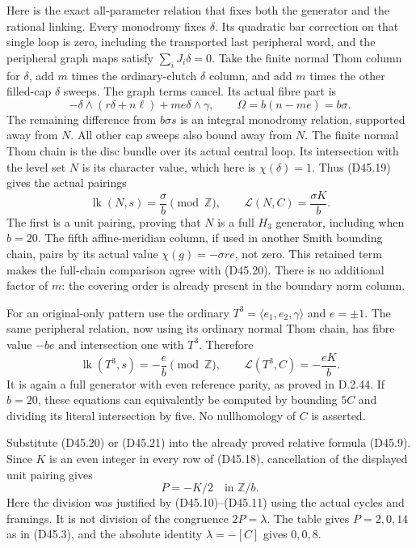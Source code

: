 Here is the exact all-parameter relation that fixes
both the generator and the rational linking.
Every monodromy fixes $\delta$. Its quadratic bar
correction on that single loop is zero, including
the transported last peripheral word, and the
peripheral graph maps satisfy $\sum_iJ_i\delta=0$.
Take the finite normal Thom column for $\delta$,
add $m$ times the ordinary-clutch $\delta$ column,
and add $m$ times the other filled-cap $\delta$ sweeps.
The graph terms cancel. Its actual fibre part is
\[
 -\delta\wedge(r\delta+n\ell)+me\delta\wedge\gamma,
 \qquad \Omega=b(n-me)=b\sigma.                            \tag{D45.19}
\]
The remaining difference from $b\sigma s$ is an
integral monodromy relation, supported away from $N$.
All other cap sweeps also bound away from $N$.
The finite normal Thom chain is the disc bundle
over its actual central loop. Its intersection
with the level set $N$ is its character value,
which here is $\chi(\delta)=1$.
Thus (D45.19) gives the actual pairings
\[
 \operatorname{lk}(N,s)=\frac{\sigma}{b}\pmod{\mathbb Z},
 \qquad \mathcal L(N,C)=\frac{\sigma K}{b}.                 \tag{D45.20}
\]
The first is a unit pairing, proving that $N$ is a
full $H_3$ generator, including when $b=20$.
The fifth affine-meridian column, if used in another
Smith bounding chain, pairs by its actual value
$\chi(g)=-\sigma re$, not zero. This retained term
makes the full-chain comparison agree with (D45.20).
There is no additional factor of $m$: the covering
order is already present in the boundary norm column.

For an original-only pattern use the ordinary
$T^3=\langle e_1,e_2,\gamma\rangle$ and $e=\pm1$.
The same peripheral relation, now using its ordinary
normal Thom chain, has fibre value $-be$ and
intersection one with $T^3$. Therefore
\[
 \operatorname{lk}(T^3,s)=-\frac e b\pmod{\mathbb Z},
 \qquad \mathcal L(T^3,C)=-\frac{eK}{b}.                    \tag{D45.21}
\]
It is again a full generator with even reference parity,
as proved in D.2.44. If $b=20$, these equations can
equivalently be computed by bounding $5C$ and dividing
its literal intersection by five. No nullhomology
of $C$ is asserted.

Substitute (D45.20) or (D45.21) into the already
proved relative formula (D45.9). Since $K$ is an
even integer in every row of (D45.18), cancellation
of the displayed unit pairing gives
\[
                       P=-K/2\quad\text{in }\mathbb Z/b.
                                                               \tag{D45.22}
\]
Here the division was justified by (D45.10)--(D45.11)
using the actual cycles and framings. It is not
division of the congruence $2P=\lambda$.
The table gives $P=2,0,14$ as in (D45.3), and the
absolute identity $\lambda=-[C]$ gives $0,0,8$.

